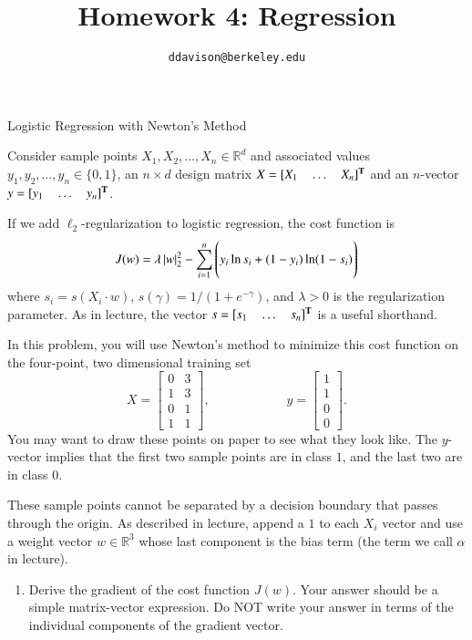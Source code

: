 \documentclass[section]{problemset}
\title{Homework 4: Regression}
\subtitle{\texttt{ddavison@berkeley.edu}}
\def\1{{\mathbf 1}}
\begin{document}
\newpage


\begin{problem}{Logistic Regression with Newton's Method}

Consider sample points $X_1, X_2, \ldots, X_n \in \mathbb{R}^d$ and
associated values $y_1, y_2, \ldots, y_n \in \{ 0, 1 \}$,
an $n \times d$ design matrix $X = [X_1~~~~\dots~~~~X_n]^{\mathbf{T}}$ and
an $n$-vector $y = [y_1~~~~\dots~~~~y_n]^{\mathbf{T}}$.

If we add $\ell_2$-regularization to logistic regression,
the cost function is
\[
J(w) = \lambda \, |w|^2_2 -
\sum_{i=1}^n \left(y_i \ln s_i + (1-y_i) \ln (1 - s_i) \rule{0pt}{18pt} \right)
\]
where $s_i = s(X_i \cdot w)$, $s(\gamma) = 1 / (1 + e^{- \gamma})$, and
$\lambda > 0$ is the regularization parameter.
As in lecture, the vector $s = [s_1~~~~\dots~~~~s_n]^{\mathbf{T}}$ is
a useful shorthand.

In this problem, you will use Newton's method to minimize this cost function
on the four-point, two dimensional training set
\[
X = \begin{bmatrix} 0 &3 \\ 1& 3\\ 0 &1\\ 1 &1 \end{bmatrix},
\hspace{1in}
y = \begin{bmatrix} 1\\1\\0\\0 \end{bmatrix}.
\]
You may want to draw these points on paper to see what they look like.
The $y$-vector implies that the first two sample points are in class $1$, and
the last two are in class $0$.

These sample points cannot be separated by a decision boundary that
passes through the origin.
As described in lecture, append a $1$ to each $X_i$ vector and
use a weight vector $w \in \mathbb{R}^3$ whose last component is
the bias term (the term we call $\alpha$ in lecture).

\begin{enumerate}
\item
Derive the gradient of the cost function $J(w)$.
Your answer should be a simple matrix-vector expression.
Do NOT write your answer in terms of the individual components of
the gradient vector.

\begin{comment}
\begin{mdframed}
\textbf{Initial verbose version}:


\end{comment}
\end{enumerate}
\end{problem}
\end{document}
